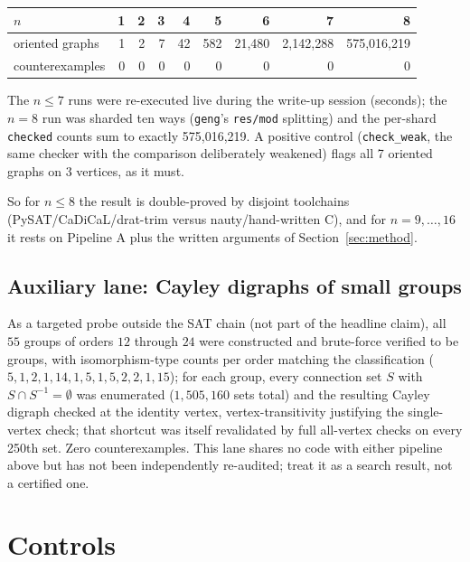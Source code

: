\documentclass[11pt]{article}
\begin{document}
\begin{center}
\begin{tabular}{lrrrrrrrr}
\toprule
$n$ & 1 & 2 & 3 & 4 & 5 & 6 & 7 & 8 \\
\midrule
oriented graphs & 1 & 2 & 7 & 42 & 582 & 21{,}480 & 2{,}142{,}288 & 575{,}016{,}219 \\
counterexamples & 0 & 0 & 0 & 0 & 0 & 0 & 0 & 0 \\
\bottomrule
\end{tabular}
\end{center}

The $n \le 7$ runs were re-executed live during the write-up session
(seconds); the $n = 8$ run was sharded ten ways
(\texttt{geng}'s \texttt{res/mod} splitting) and the per-shard
\texttt{checked} counts sum to exactly 575{,}016{,}219. A positive control
(\texttt{check\_weak}, the same checker with the comparison deliberately
weakened) flags all 7 oriented graphs on 3 vertices, as it must.

So for $n \le 8$ the result is double-proved by disjoint toolchains
(PySAT/CaDiCaL/drat-trim versus nauty/hand-written C), and for
$n = 9,\dots,16$ it rests on Pipeline A plus the written arguments of
Section~\ref{sec:method}.

\subsection{Auxiliary lane: Cayley digraphs of small groups}

As a targeted probe outside the SAT chain (not part of the headline
claim), all
$55$ groups of orders $12$ through $24$ were constructed and brute-force
verified to be groups, with isomorphism-type counts per order matching the
classification ($5,1,2,1,14,1,5,1,5,2,2,1,15$); for each group, every
connection set $S$ with $S \cap S^{-1} = \emptyset$ was enumerated
($1{,}505{,}160$ sets total) and the resulting Cayley digraph checked at
the identity vertex, vertex-transitivity justifying the single-vertex
check; that shortcut was itself revalidated by full all-vertex checks on
every 250th set. Zero counterexamples. This lane shares no code with either
pipeline above but has not been independently re-audited; treat it as a
search result, not a certified one.

\section{Controls}\label{sec:controls}
\end{document}
